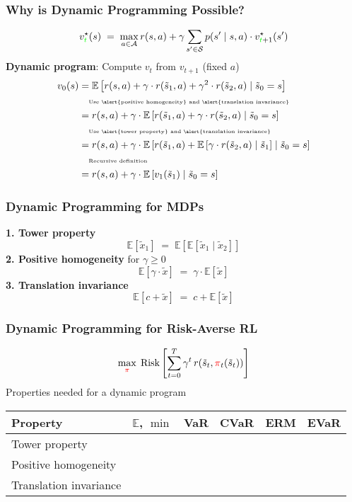 \documentclass{beamer}
\newcommand{\opt}{^{\star}}
\newcommand{\tc}[2]{\textcolor{#1}{#2}}
\newcommand{\tcr}[1]{\tc{red}{#1}}
\newcommand{\tcg}[1]{\tc{green}{#1}}
\newcommand{\cmark}{\tcg{\ding{51}}}%
\newcommand{\xmark}{\tcr{\ding{55}}}%
\newcommand{\E}{\mathbb{E}}
\newcommand{\Ex}[1]{\E \left[#1 \right]}
\newcommand{\risko}{\operatorname{Risk}}
\newcommand{\risk}[1]{\risko\left[#1\right]}
\begin{document}
\begin{frame} \frametitle{Why is Dynamic Programming Possible?}
  \[
   v_{\tcg{t}}\opt(s) \;=\; \max_{a\in \mathcal{A}} r(s,a) + \gamma \sum_{s'\in \mathcal{S}}  p(s' \mid s,a) \cdot v_{\tcg{t}+1}\opt(s')
  \] 
\vfill 
  \textbf{Dynamic program}: Compute $v_t$ from $v_{t+1}$ (fixed $a$)
\begin{align*}
  v_0(s) 
  &= \Ex{r(s,a) + \gamma \cdot r(\tilde{s}_1,a) + \gamma^2 \cdot r(\tilde{s}_2,a) \mid \tilde{s}_0 = s} \\
  & \quad  \text{\tiny Use \alert{positive homogeneity} and \alert{translation invariance}} \\
  &= r(s,a) + \gamma \cdot \Ex{r(\tilde{s}_1,a) + \gamma \cdot r(\tilde{s}_2,a) \mid \tilde{s}_0 = s} \\
  & \quad  \text{\tiny Use \alert{tower property} and \alert{translation invariance}} \\
  &= r(s,a) + \gamma \cdot \Ex{ r(\tilde{s}_1,a) + \Ex{ \gamma\cdot  r(\tilde{s}_2,a) \mid \tilde{s}_1} \mid \tilde{s}_0 = s}  \\
& \quad \text{\tiny Recursive definition} \\
&= r(s,a) + \gamma \cdot \Ex{ v_1(\tilde{s}_1) \mid  \tilde{s}_0 = s}  \\
\end{align*}
\end{frame}


\begin{frame} \frametitle{Dynamic Programming for MDPs}
  
  \textbf{1. Tower property} 
  \[
    \E[\tilde{x}_1] \;=\; \E\left[\E[\tilde{x}_1 \mid \tilde{x}_2]\right]
  \]
  \vfill 
  \textbf{2. Positive homogeneity} for $\gamma \ge 0$ 
  \[
   \E[\gamma \cdot  \tilde{x}] \;=\;  \gamma \cdot  \E[\tilde{x}]
 \]
 \vfill 
  \textbf{3. Translation invariance} 
  \[
   \E[c + \tilde{x}]  \;=\;  c + \E[\tilde{x}]
  \]
\end{frame}

\begin{frame} \frametitle{Dynamic Programming for Risk-Averse RL}
      \[
        \max_{\tcr{\pi}} \; \risk{\sum_{t=0}^T \gamma^t \, r(\tilde{s}_t, \tcr{\pi}_t(\tilde{s}_t)) }
      \]
      \vfill
    Properties needed for a dynamic program
    \begin{center}
        \begin{tabular}{|l|ccccc|}
        \toprule
        Property & $\mathbb{E}$, $\min$ & VaR & CVaR & ERM & EVaR \\
        \midrule
        Tower property    & \cmark & \xmark & \xmark & \cmark & \xmark \\
        Positive homogeneity   & \cmark & \cmark & \cmark & \xmark & \cmark \\
        Translation invariance  & \cmark & \cmark & \cmark & \cmark & \cmark \\
        \bottomrule
        \end{tabular}
      \end{center}
\end{frame}
\end{document}
